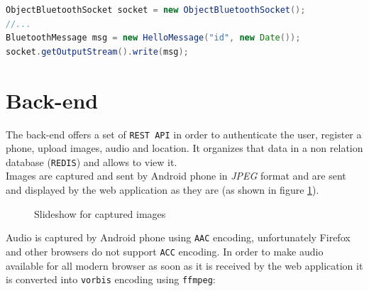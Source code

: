 \documentclass[conference, 11pt]{IEEEtran}
\begin{document}
\begin{lstlisting}[language=Java, caption=Bluetooth sending of an HelloMessage]
ObjectBluetoothSocket socket = new ObjectBluetoothSocket();
//...
BluetoothMessage msg = new HelloMessage("id", new Date());
socket.getOutputStream().write(msg);

\end{lstlisting}


\section{\textbf{Back-end}}
The back-end offers a set of \texttt{REST API} in order to authenticate the user, register a phone, upload images, audio and location. It organizes that data in a non relation database (\texttt{REDIS}) and allows to view it.\\

Images are captured and sent by Android phone in \textit{JPEG} format and are sent and displayed by the web application as they are (as shown in figure \ref{img:slideshow}).\\

\begin{figure}[!ht]
\begin{center}
\caption{Slideshow for captured images}
\label{img:slideshow}
\end{center}
\end{figure}

Audio is captured by Android phone using \texttt{AAC} encoding, unfortunately Firefox and other browsers do not support \texttt{ACC} encoding. In order to make audio available for all modern browser as soon as it is received by the web application it is converted into \texttt{vorbis} encoding using \texttt{ffmpeg}:
\end{document}
